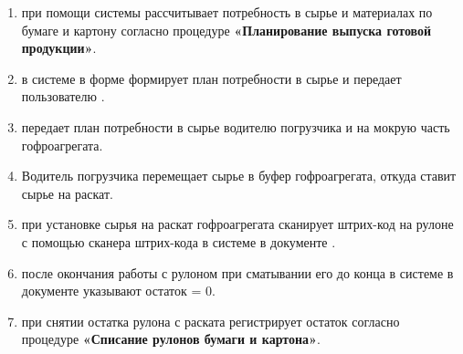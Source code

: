 \begin{enumerate}





\item 	\planner при помощи системы \gofro рассчитывает потребность в сырье и материалах по бумаге и картону согласно процедуре \textbf{«Планирование выпуска готовой продукции»}.
\item 	\planner в системе \gofro в форме  
формирует план потребности в сырье  и передает пользователю \gaoperator.
\item	\gaoperator передает план потребности в сырье водителю погрузчика и \linkoperator на мокрую часть гофроагрегата. 
\item	Водитель погрузчика перемещает сырье в буфер гофроагрегата, откуда \linkoperator ставит сырье на раскат.
\item	\linkoperator при установке сырья на раскат гофроагрегата сканирует штрих-код на рулоне с помощью сканера штрих-кода в системе \gofro в документе .
 \item	\linkoperator после окончания работы с рулоном при сматывании его до конца в системе \gofro в документе  указывают остаток = 0. 
 \item	\linkoperator при снятии остатка рулона с раската регистрирует остаток согласно процедуре \textbf{«Списание рулонов бумаги и картона»}.


\end{enumerate}




